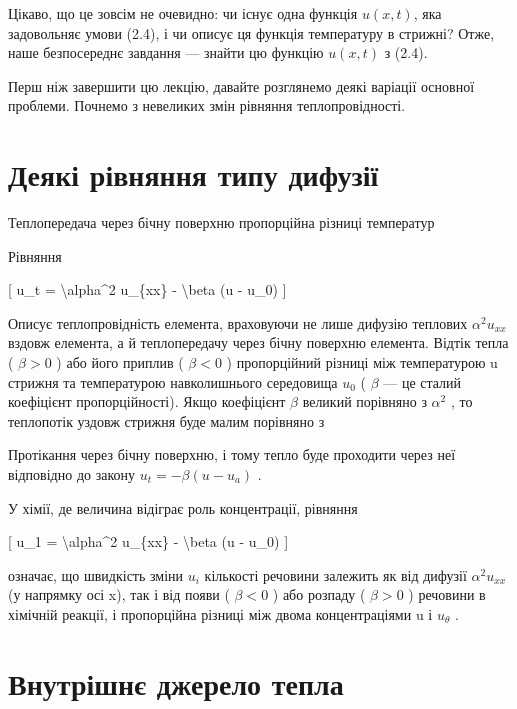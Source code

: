 \documentclass[
]{article}
\begin{document}
Цікаво, що це зовсім не очевидно: чи існує одна функція \(u(x, t)\), яка
задовольняє умови (2.4), і чи описує ця функція температуру в стрижні?
Отже, наше безпосереднє завдання --- знайти цю функцію \(u(x, t)\) з
(2.4).

Перш ніж завершити цю лекцію, давайте розглянемо деякі варіації основної
проблеми. Почнемо з невеликих змін рівняння теплопровідності.

\section{Деякі рівняння типу
дифузії}\label{ux434ux435ux44fux43aux456-ux440ux456ux432ux43dux44fux43dux43dux44f-ux442ux438ux43fux443-ux434ux438ux444ux443ux437ux456ux457}

Теплопередача через бічну поверхню пропорційна різниці температур

Рівняння

{[} u\_t = \textbackslash alpha\^{}2 u\_\{xx\} - \textbackslash beta (u
- u\_0) {]}

Описує теплопровідність елемента, враховуючи не лише дифузію теплових
\(\alpha^2 u_{xx}\) вздовж елемента, а й теплопередачу через бічну
поверхню елемента. Відтік тепла ( \(\beta > 0\) ) або його приплив (
\(\beta < 0\) ) пропорційний різниці між температурою u стрижня та
температурою навколишнього середовища \(u_0\) ( \(\beta\) --- це сталий
коефіцієнт пропорційності). Якщо коефіцієнт \(\beta\) великий порівняно
з \(\alpha^2\) , то теплопотік уздовж стрижня буде малим порівняно з

Протікання через бічну поверхню, і тому тепло буде проходити через неї
відповідно до закону \(u_t = -\beta (u - u_a)\) .

У хімії, де величина відіграє роль концентрації, рівняння

{[} u\_1 = \textbackslash alpha\^{}2 u\_\{xx\} - \textbackslash beta (u
- u\_0) {]}

означає, що швидкість зміни \(u_i\) кількості речовини залежить як від
дифузії \(\alpha^2 u_{xx}\) (у напрямку осі x), так і від появи (
\(\beta < 0\) ) або розпаду ( \(\beta > 0\) ) речовини в хімічній
реакції, і пропорційна різниці між двома концентраціями u і
\(u_{\theta}\) .

\section{Внутрішнє джерело
тепла}\label{ux432ux43dux443ux442ux440ux456ux448ux43dux454-ux434ux436ux435ux440ux435ux43bux43e-ux442ux435ux43fux43bux430}
\end{document}
